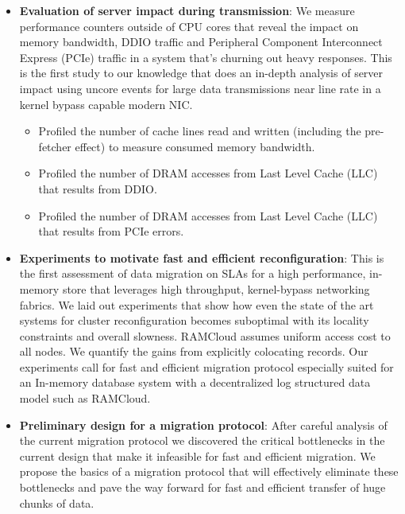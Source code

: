 \begin{itemize}
    \item{\textbf{Evaluation of server impact during transmission}}: We measure performance counters outside of CPU cores that reveal the impact on memory bandwidth,
     DDIO traffic and Peripheral Component Interconnect Express (PCIe) traffic in a system that's churning out heavy responses. This is the first study to our knowledge that does an 
     in-depth analysis of server impact using uncore events for large data transmissions near line rate in a kernel bypass capable modern NIC.
     \begin{itemize}
     \item Profiled the number of cache lines read and written (including the pre-fetcher effect) to measure consumed memory bandwidth.
     \item Profiled the number of DRAM accesses from Last Level Cache (LLC) that results from DDIO.
     \item Profiled the number of DRAM accesses from Last Level Cache (LLC) that results from PCIe errors.
     \end{itemize}


  \item{\textbf{Experiments to motivate fast and efficient reconfiguration}}: This is the first assessment of data migration on SLAs for a high performance,
    in-memory store that leverages high throughput, kernel-bypass networking fabrics. 
   We laid out experiments that show how even the state of the art systems for cluster reconfiguration becomes suboptimal with its locality constraints and overall slowness. 
   RAMCloud assumes uniform access cost to all nodes. We quantify the gains from explicitly colocating records.
   Our experiments call for fast and efficient migration protocol especially suited for an In-memory database system with a decentralized log structured data model such as RAMCloud.

  \item{\textbf{Preliminary design for a migration protocol}}: After careful analysis of the current migration protocol
   we discovered the critical bottlenecks in the current design that make it infeasible for fast and efficient migration.
   We propose the basics of a \linebreak migration protocol that will effectively eliminate these bottlenecks and pave the way
   forward for fast and efficient transfer of huge chunks of data.

\end{itemize}

